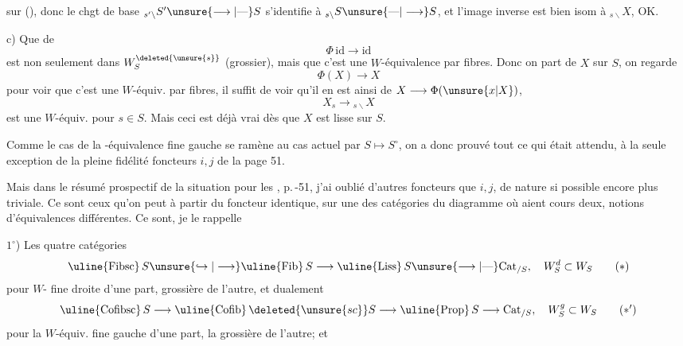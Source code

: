 sur  (), donc le chgt de base ${}_{s'\backslash}S'\unsure{\longrightarrow|\text{---}}S$ s'identifie à ${}_{s\backslash}S\unsure{\text{---}|\longrightarrow}S$, et l'image inverse est bien isom à ${}_{s\backslash}X$, OK.

c) Que de 
\[
 \Phi\,\mathrm{id}\longrightarrow\mathrm{id}
\]
est non seulement dans $W_S^{\deleted{\unsure{s}}}$ (grossier), mais que c'est une $W$-équivalence  par fibres. Donc on part de $X$  sur $S$, on regarde
\[
 \Phi(X)\longrightarrow X
\]
pour voir que c'est une $W$-équiv. par fibres, il suffit de voir qu'il en est ainsi de $X\longrightarrow\Phi(\unsure{x|X})$,  
\[
 X_s\longrightarrow{}_{s\backslash}X
\]
est une $W$-équiv. pour  $s\in S$. Mais ceci est déjà vrai dès que $X$ est lisse sur $S$.

Comme le cas de la -équivalence fine gauche se ramène au cas actuel par $S\mapsto S^\circ$, on a donc prouvé tout ce qui était attendu, à la seule exception de la pleine fidélité  foncteurs $i,j$ de la page 51.

\medskip
Mais dans le résumé prospectif de la situation pour les , p.\,-51, j'ai oublié d'autres foncteurs que $i,j$, de nature si possible encore plus triviale. Ce sont
ceux qu'on peut  à partir du foncteur identique, sur une des catégories du diagramme  où aient cours deux,  notions d'équivalences différentes. Ce sont, je le rappelle

$1^\circ$) Les  quatre catégories
\[
 \text{\uline{Fibsc}}\,S\unsure{\hookrightarrow|\longrightarrow}\text{\uline{Fib}}\,S\longrightarrow\text{\uline{Liss}}\,S\unsure{\longrightarrow|\text{---}}\mathrm{Cat}_{/S},\quad W_S^d\subset W_S
 \tag*{$(*)$}
\]
pour   $W$- fine droite d'une part, grossière de l'autre, et dualement
\[
 \text{\uline{Cofibsc}}\,S\longrightarrow\text{\uline{Cofib}}\,\deleted{\unsure{sc}}S\longrightarrow\text{\uline{Prop}}\,S\longrightarrow\mathrm{Cat}_{/S},\quad W_S^g\subset W_S
 \tag*{$(*')$}
\]
pour la $W$-équiv. fine gauche d'une part, la grossière de l'autre\textup{;} et  

